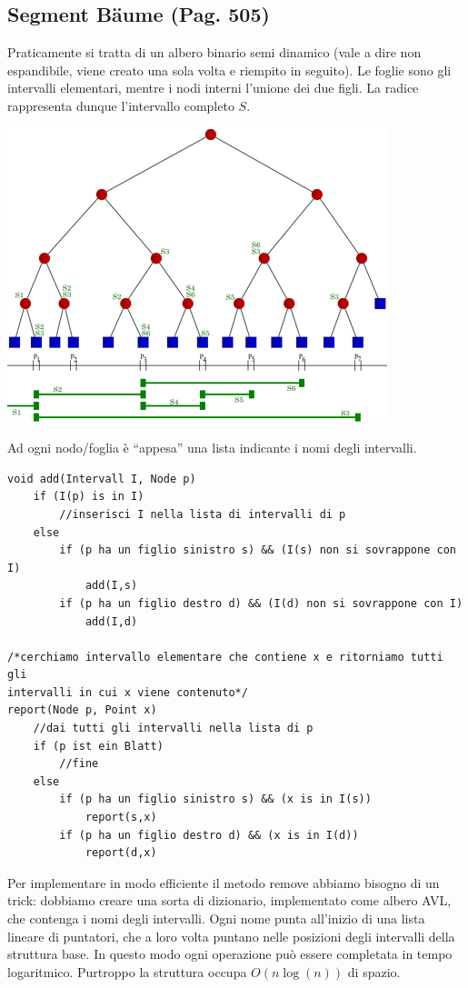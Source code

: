 \documentclass[a4paper]{book}
\newcommand{\lstIndent}{4}
\begin{document}
\subsection{Segment Bäume (Pag. 505)}
Praticamente si tratta di un albero binario semi dinamico (vale a dire non espandibile, viene creato una sola volta e riempito in seguito). Le foglie sono gli intervalli elementari, mentre i nodi interni l'unione dei due figli. La radice rappresenta dunque l'intervallo completo $S$.
\begin{center}
\includegraphics[scale=0.7]{Figures/segmenttree.png}
\end{center}
Ad ogni nodo/foglia è ``appesa'' una lista indicante i nomi degli intervalli.
\begin{lstlisting}[tabsize=\lstIndent]
void add(Intervall I, Node p)
	if (I(p) is in I)
		//inserisci I nella lista di intervalli di p
	else
		if (p ha un figlio sinistro s) && (I(s) non si sovrappone con I)
			add(I,s)
		if (p ha un figlio destro d) && (I(d) non si sovrappone con I)
			add(I,d)
			
/*cerchiamo intervallo elementare che contiene x e ritorniamo tutti gli 
intervalli in cui x viene contenuto*/			
report(Node p, Point x)
	//dai tutti gli intervalli nella lista di p	
	if (p ist ein Blatt)
		//fine
	else
		if (p ha un figlio sinistro s) && (x is in I(s))
			report(s,x)
		if (p ha un figlio destro d) && (x is in I(d))
			report(d,x)				
\end{lstlisting}
Per implementare in modo efficiente il metodo remove abbiamo bisogno di un trick: dobbiamo creare una sorta di dizionario, implementato come albero AVL, che contenga i nomi degli intervalli. Ogni nome punta all'inizio di una lista lineare di puntatori, che a loro volta puntano nelle posizioni degli intervalli della struttura base. In questo modo ogni operazione può essere completata in tempo logaritmico. Purtroppo la struttura occupa $O(n \log(n))$ di spazio.
\end{document}
